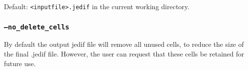 Default: \texttt{<inputfile>.jedif} in the current working directory.


\subsubsection{\texttt{--no\_delete\_cells}}
By default the output jedif file will remove all unused cells, to 
reduce the size of the final .jedif file. 
However, the user can request that these cells be retained for 
future use.




